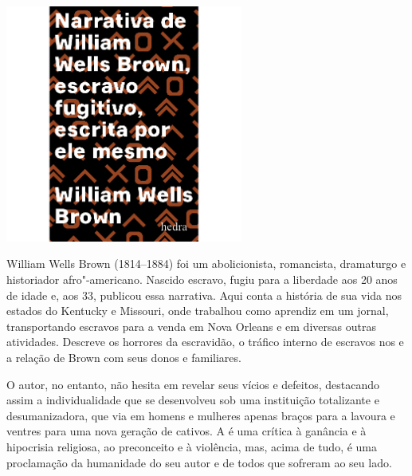 \pagebreak

\begin{center}
\hspace*{-3.5cm}
\hspace*{3cm}\includegraphics[width=78mm]{./grid/brown.jpg}
\end{center}

\hspace*{-7cm}\hrulefill\hspace*{-7cm}

\medskip

\noindent{}William Wells Brown (1814--1884) foi um abolicionista, romancista, dramaturgo e historiador afro"-americano. Nascido escravo, fugiu para a liberdade aos 20 anos de idade e, aos 33, publicou essa narrativa. Aqui conta a história de sua vida nos estados do Kentucky e Missouri, onde trabalhou como aprendiz em um jornal, transportando escravos para a venda em Nova Orleans e em diversas outras atividades. Descreve os horrores da escravidão, o tráfico interno de escravos nos  e a relação de Brown com seus donos e familiares.

O autor, no entanto, não hesita em revelar seus vícios e defeitos, destacando assim a individualidade que se desenvolveu sob uma instituição totalizante e desumanizadora, que via em homens e mulheres apenas braços para a lavoura e ventres para uma nova geração de cativos. A {} é uma crítica à ganância e à hipocrisia religiosa, ao preconceito e à violência, mas, acima de tudo, é uma proclamação da humanidade do seu autor e de todos que sofreram ao seu lado.

\vfill

\hspace*{-.4cm}\begin{minipage}[c]{1\linewidth}
\small{
{}}
\end{minipage}

